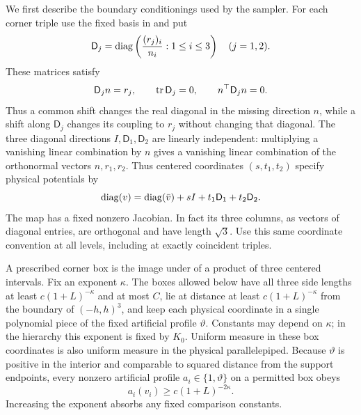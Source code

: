 We first describe the boundary conditionings used by the sampler.  For
each corner triple use the fixed basis in  and put
\begin{equation}
 \mathsf D_j=\operatorname{diag}\left(\frac{(r_j)_i}{n_i}:1\le i\le3\right)
 \quad(j=1,2).
 \label{cell:box-directions}
\end{equation}
These matrices satisfy
\[
 \mathsf D_jn=r_j,\qquad \operatorname{tr}\mathsf D_j=0,
 \qquad n^\top\mathsf D_jn=0.
\]
Thus a common shift changes the real diagonal in the missing direction
$n$, while a shift along $\mathsf D_j$ changes its coupling to $r_j$
without changing that diagonal. The three diagonal directions
$I,\mathsf D_1,\mathsf D_2$ are linearly independent:
multiplying a vanishing linear combination by $n$ gives a vanishing
linear combination of the orthonormal vectors $n,r_1,r_2$.
Thus centered coordinates $(s,t_1,t_2)$ specify physical potentials by
\begin{equation}
 \operatorname{diag}(v)=\operatorname{diag}(\bar v)+sI+t_1\mathsf D_1+t_2\mathsf D_2.
 \label{cell:box-coordinates}
\end{equation}
The map has a fixed nonzero Jacobian.  In fact its three columns, as
vectors of diagonal entries, are orthogonal and have length $\sqrt3$.
Use this same coordinate convention at all levels, including at exactly
coincident triples.

A prescribed corner box is the image under 
of a product of three centered intervals.  Fix an exponent $\kappa$.
The boxes allowed below have all three side lengths at least
$c(1+L)^{-\kappa}$ and at most $C$, lie at distance at least
$c(1+L)^{-\kappa}$ from the boundary of $(-h,h)^3$, and keep each physical
coordinate in a single polynomial piece of the fixed artificial profile
$\vartheta$.  Constants may depend on $\kappa$; in the hierarchy this
exponent is fixed by $K_0$.  Uniform measure in these box coordinates
is also uniform measure in the physical parallelepiped.  Because
$\vartheta$ is positive in the interior and comparable to squared
distance from the support endpoints, every nonzero artificial profile
$a_i\in\{1,\vartheta\}$ on a permitted box obeys
\begin{equation}
 a_i(v_i)\ge c(1+L)^{-2\kappa}.
 \label{cell:box-profile-lower}
\end{equation}
Increasing the exponent absorbs any fixed comparison constants.

